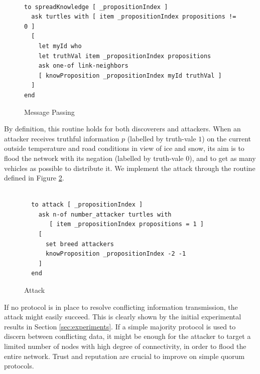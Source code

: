 \documentclass[compsoc, conference, letterpaper, 10pt, times]{IEEEtran}
\begin{document}
\begin{figure}[t]
 	\lstset{language=Java,
 		basicstyle=\scriptsize,
 		mathescape}

    \begin{lstlisting}[frame=single]  % Start your code-block

to spreadKnowledge [ _propositionIndex ]
  ask turtles with [ item _propositionIndex propositions != 0 ]
  [
    let myId who
    let truthVal item _propositionIndex propositions
    ask one-of link-neighbors
    [ knowProposition _propositionIndex myId truthVal ]
  ]
end
\end{lstlisting}
\caption{Message Passing}\label{fig:spread}
%
\end{figure}
By definition, this routine holds for both discoverers and attackers. When an attacker receives truthful information $p$ (labelled by truth-vale $1$) on the current outside temperature and road conditions in view of ice and snow, its aim is to flood the network with its negation (labelled by truth-vale $0$), and to get as many vehicles as possible to distribute it. We implement the attack through the routine defined in Figure \ref{fig:attack}.

\begin{figure}[t]
 	\lstset{language=Java,
 		basicstyle=\scriptsize,
 		mathescape}
 	\begin{lstlisting}[frame=single]  % Start your code-block

  to attack [ _propositionIndex ]
    ask n-of number_attacker turtles with
       [ item _propositionIndex propositions = 1 ]
    [
      set breed attackers
      knowProposition _propositionIndex -2 -1
    ]
  end
\end{lstlisting}
\caption{Attack}\label{fig:attack}
%
\end{figure}
If no protocol is in place to resolve conflicting information transmission, the attack might easily succeed. This is clearly shown by the initial experimental results in Section \ref{sec:experiments}. If a simple majority protocol is used to discern between conflicting data, it might be enough for the attacker to target a limited number of nodes with high degree of connectivity, in order to flood the entire network. Trust and reputation are crucial to improve on simple quorum protocols.
\end{document}
